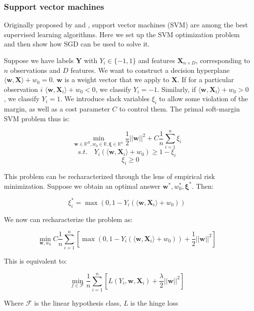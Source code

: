 \documentclass{article}
\begin{document}
\subsubsection{Support vector machines}

Originally proposed by \cite{boser1992training} and \cite{cortes1995support}, support vector machines (SVM)
are among the best supervised learning algorithms. Here we set up the SVM
optimization
problem and then show how SGD can be used to solve it.

Suppose we have labels $\bm{Y}$ with $Y_i \in \{-1,1\}$ and features $\bm{X}_{n
\times D}$, corresponding to $n$ observations and $D$ features.
We want to construct a decision hyperplane 
$\langle \bm{w}, \bm{X} \rangle + w_0= 0$. $\bm{w}$ is
a weight vector that we apply to $\bm{X}$. If for a particular observation $i$
$\langle \bm{w}, \bm{X}_i \rangle + w_0 < 0$, we
classify $Y_i=-1$. Similarly, if $\langle \bm{w}, \bm{X}_i \rangle + w_0 > 0$, we
classify $Y_i = 1$. We introduce slack variables $\xi_i$ to allow some
violation of the margin, as well as a cost parameter $C$ to control them. The
primal soft-margin SVM problem thus is:

\begin{equation}
	\min_{\bm{w} \in \mathbb{R}^D, w_0 \in \mathbb{R}, \bm{\xi} \in \mathbb{R}^n} 
	\frac{1}{2} ||\bm{w}||^2 + C \frac{1}{n} \sum_{i=1}^n \xi_i
\end{equation}
$$
s.t. \quad Y_i(\langle \bm{w}, \bm{X}_i \rangle + w_0) \geq 1 - \xi_i 
$$
$$
\quad \xi_i \geq 0 
$$

This problem can be recharacterized through the lens of empirical risk
minimization. Suppose we obtain an optimal answer $\bm{w}^*, w_0^*, \bm{\xi}^*$. 
Then:

$$
\xi_i^* = \max(0, 1 - Y_i(\langle \bm{w}, \bm{X}_i \rangle + w_0)) 
$$

We now can recharacterize the problem as:

$$
\min_{\bm{w}, w_0} C \frac{1}{n} \sum_{i=1}^n \left[ \max(0, 1 - Y_i(\langle \bm{w},
\bm{X}_i \rangle +
w_0)) + \frac{1}{2}||\bm{w}||^2 \right]
$$

This is equivalent to:

\begin{equation}
\min_{f \in \mathcal{F}} \frac{1}{n} \sum_{i=1}^n \left[ L(Y_i, \bm{w},
	\bm{X}_i) + \frac{\lambda}{2}
||\bm{w}||^2 \right]
\end{equation}

Where $\mathcal{F}$ is the linear hypothesis class, $L$ is the hinge loss
\end{document}
